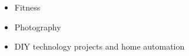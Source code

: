 \vspace{1em}
\begin{itemize}
    \item Fitness
    \item Photography
    \item DIY technology projects and home automation
\end{itemize}
